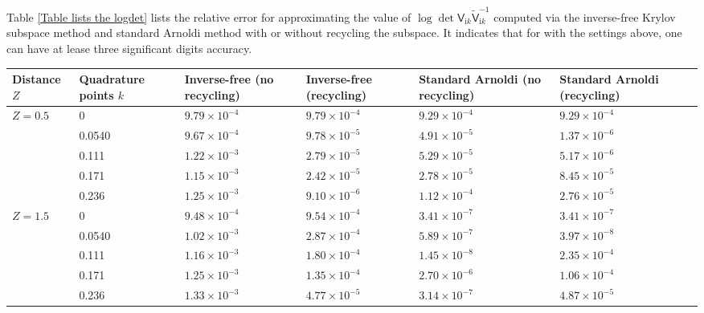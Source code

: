 Table \ref{Table lists the logdet} lists the relative error for approximating the value of $\log\det\mathsf{V}_{\mathrm{i}k}\tilde{\mathsf{V}}_{\mathrm{i}k}^{-1}$ 
computed via the inverse-free Krylov subspace method and standard Arnoldi method with or without recycling the subspace. It indicates that for with the settings above, one 
can have at lease three significant digits accuracy.
 
\begin{table}[H]
    \centering
    \begin{tabular}{ |M{1.5cm}|M{1.7cm}|M{2.2cm} |M{2.2cm}|M{2.2cm}|M{3cm}|M{2.2cm}| } 
    \hline
    Distance $Z$ & Quadrature points $k$ &  Inverse-free (no recycling) & Inverse-free (recycling) & Standard Arnoldi (no recycling) & Standard Arnoldi (recycling)\\
    \hline
       & 0        & $9.79\times 10^{-4}$  & $9.79\times 10^{-4}$  &$9.29\times 10^{-4}$ &$9.29\times 10^{-4}$\\ 
                                   & 0.0540   & $9.67\times 10^{-4}$  & $9.78\times 10^{-5}$  &$4.91\times 10^{-5}$ &$1.37\times 10^{-6}$\\ 
                                   & 0.111    & $1.22\times 10^{-3}$  & $2.79\times 10^{-5}$  &$5.29\times 10^{-5}$ &$5.17\times 10^{-6}$\\ 
                                   & 0.171    & $1.15\times 10^{-3}$  & $2.42\times 10^{-5}$  &$2.78\times 10^{-5}$ &$8.45\times 10^{-5}$\\ 
                                   & 0.236    & $1.25\times 10^{-3}$  & $9.10\times 10^{-6}$  &$1.12\times 10^{-4}$ &$2.76\times 10^{-5}$\\ 
    \hline
    \hline
       & 0        & $9.48\times 10^{-4}$  & $9.54\times 10^{-4}$  &$3.41\times 10^{-7}$ &$3.41\times 10^{-7}$\\ 
                                   & 0.0540   & $1.02\times 10^{-3}$  & $2.87\times 10^{-4}$  &$5.89\times 10^{-7}$ &$3.97\times 10^{-8}$\\ 
                                   & 0.111    & $1.16\times 10^{-3}$  & $1.80\times 10^{-4}$  &$1.45\times 10^{-8}$ &$2.35\times 10^{-4}$\\ 
                                   & 0.171    & $1.25\times 10^{-3}$  & $1.35\times 10^{-4}$  &$2.70\times 10^{-6}$ &$1.06\times 10^{-4}$\\ 
                                   & 0.236    & $1.33\times 10^{-3}$  & $4.77\times 10^{-5}$  &$3.14\times 10^{-7}$ &$4.87\times 10^{-5}$\\ 

\end{tabular}
\end{table}
